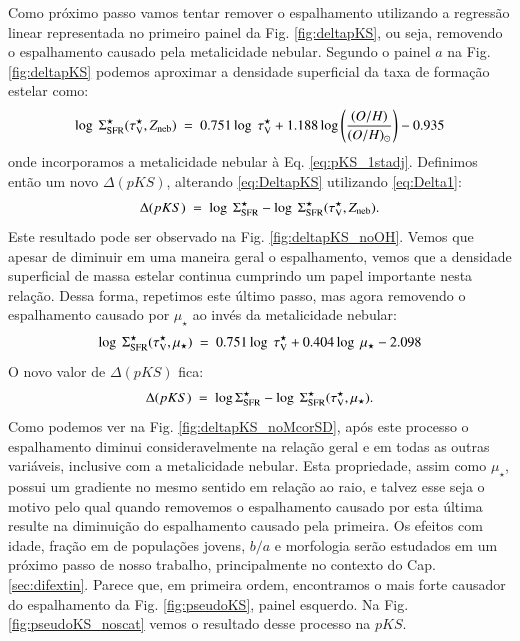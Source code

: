 Como próximo passo vamos tentar remover o espalhamento utilizando a regressão linear representada no
primeiro painel da Fig. \ref{fig:deltapKS}, ou seja, removendo o espalhamento causado pela
metalicidade nebular. Segundo o painel $a$ na Fig. \ref{fig:deltapKS} podemos aproximar a densidade
superficial da taxa de formação estelar como:
\begin{equation}
	\log\ \SigmaSFR(\tauVS, Z_{\mathrm{neb}})\ =\ 0.751 \log\ \tauVS + 1.188 \log
\left(\frac{(O/H)}{(O/H)_\odot}\right) - 0.935
	\label{eq:Delta1}
\end{equation}
\noindent onde incorporamos a metalicidade nebular à Eq. \eqref{eq:pKS_1stadj}. Definimos então um
novo $\Delta(pKS)$, alterando \eqref{eq:DeltapKS} utilizando \eqref{eq:Delta1}:
\begin{equation}
	\Delta(pKS)\ =\ \log\ \SigmaSFR - \log\ \SigmaSFR(\tauVS, Z_{\mathrm{neb}}).
\end{equation}
\noindent Este resultado pode ser observado na Fig. \ref{fig:deltapKS_noOH}. Vemos que apesar
de diminuir em uma maneira geral o espalhamento, vemos que a densidade superficial de massa estelar
continua cumprindo um papel importante nesta relação. Dessa forma, repetimos este último passo, mas
agora removendo o espalhamento causado por $\mu_\star$ ao invés da metalicidade nebular:
\begin{equation}
	\log\ \SigmaSFR(\tauVS, \mu_\star)\ =\ 0.751 \log\ \tauVS + 0.404 \log\ \mu_\star - 2.098
	\label{eq:Delta2}
\end{equation}
\noindent O novo valor de $\Delta(pKS)$ fica:
\begin{equation}
	\Delta(pKS)\ =\ \log \Sigma_{\mathrm{SFR}}^\star - \log\ \Sigma_{\mathrm{SFR}}^\star(\tau_{\mathrm{V}}^\star, \mu_\star).
\end{equation}
\noindent Como podemos ver na Fig. \ref{fig:deltapKS_noMcorSD}, após este processo o
espalhamento diminui consideravelmente na relação geral e em todas as outras variáveis, inclusive
com a metalicidade nebular. Esta propriedade, assim como $\mu_\star$, possui um gradiente no mesmo
sentido em relação ao raio, e talvez esse seja o motivo pelo qual quando removemos o espalhamento
causado por esta última resulte na diminuição do espalhamento causado pela primeira. Os efeitos com
idade, fração em de populações jovens, $b/a$ e morfologia serão estudados em um próximo passo de
nosso trabalho, principalmente no contexto do Cap. \ref{sec:difextin}. Parece que, em primeira
ordem, encontramos o mais forte causador do espalhamento da Fig. \ref{fig:pseudoKS}, painel
esquerdo. Na Fig. \ref{fig:pseudoKS_noscat} vemos o resultado desse processo na $pKS$.

